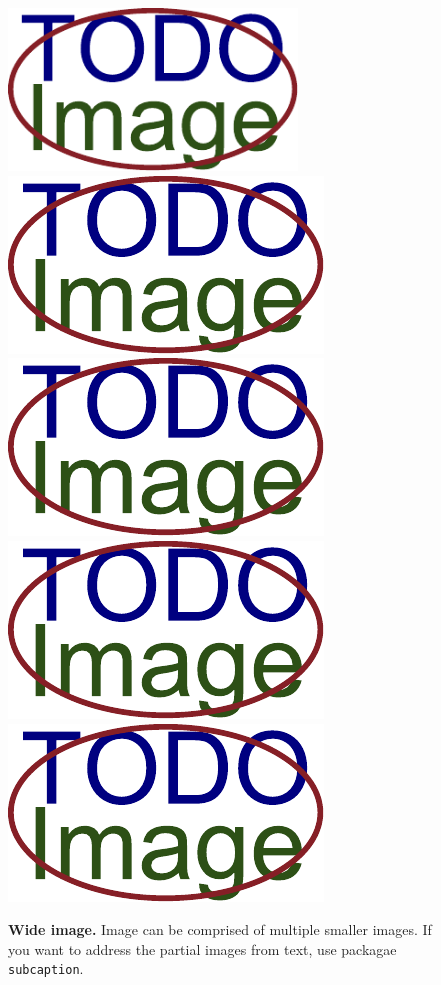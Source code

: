 \begin{figure}[h]\centering
  \centering
  \includegraphics[width=\linewidth,height=1.7in]{obrazky-figures/placeholder.pdf}\\[1pt]
  \includegraphics[width=0.24\linewidth]{obrazky-figures/placeholder.pdf}\hfill
  \includegraphics[width=0.24\linewidth]{obrazky-figures/placeholder.pdf}\hfill
  \includegraphics[width=0.24\linewidth]{obrazky-figures/placeholder.pdf}\hfill
  \includegraphics[width=0.24\linewidth]{obrazky-figures/placeholder.pdf}
  \caption{\textbf{Wide image.} Image can be comprised of multiple smaller images. If you want to address the partial images from text, use packagae \texttt{subcaption}.}
  \label{sirokyObrazek}
\end{figure}


